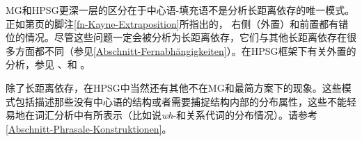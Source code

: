 MG和HPSG更深一层的区分在于中心语-填充语不是分析长距离依存的唯一模式。正如第\pageref{fn-Kayne-Extraposition}页的脚注\ref{fn-Kayne-Extraposition}所指出的， 右侧（外置）和前置都有错位的情况。尽管这些问题一定会被分析为长距离依存，它们与其他长距离依存在很多方面都不同（参见\ref{Abschnitt-Fernabhängigkeiten}）。在HPSG框架下有关外置的分析，参见 、和 。

除了长距离依存，在HPSG中当然还有其他不在MG和最简方案下的现象。这些模式包括描述那些没有中心语的结构或者需要捕捉结构内部的分布属性，这些不能轻易地在词汇分析中有所表示（比如说\emph{wh}-和关系代词的分布情况）。请参考\ref{Abschnitt-Phrasale-Konstruktionen}。

